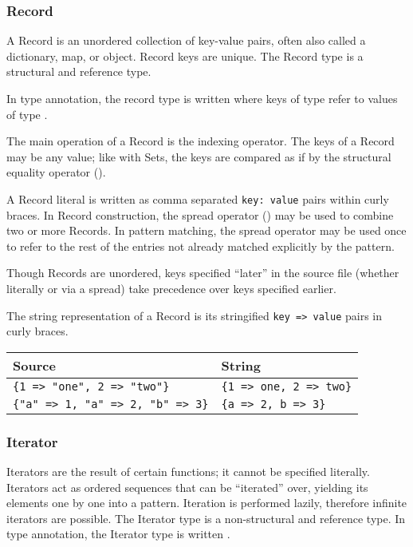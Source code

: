 \subsubsection{Record}

A Record is an unordered collection of key-value pairs, often also called
a dictionary, map, or object. Record keys are unique. The Record type is a
structural and reference type.

In type annotation, the record type is written  where keys of
type  refer to values of type .

The main operation of a Record is the indexing operator. The keys of a
Record may be any value; like with Sets, the keys are compared as if by
the structural equality operator (\op{==}).

A Record literal is written as comma separated \texttt{key: value} pairs
within curly braces. In Record construction, the spread operator ()
may be used to combine two or more Records. In pattern matching, the spread
operator may be used once to refer to the rest of the entries not already
matched explicitly by the pattern.

Though Records are unordered, keys specified ``later'' in the source file
(whether literally or via a spread) take precedence over keys specified
earlier.

The string representation of a Record is its stringified \texttt{key => value}
pairs in curly braces.

\begin{table}[H]
    \centering
    \begin{tabular}{ll}
        \hline
        \textbf{Source} & \textbf{String} \\
        \hline
        \texttt{\{1 => "one", 2 => "two"\}} & \texttt{\{1 => one, 2 => two\}} \\
        \texttt{\{"a" => 1, "a" => 2, "b" => 3\}} & \texttt{\{a => 2, b => 3\}} \\
        \hline
    \end{tabular}
\end{table}

\subsubsection{Iterator}
\label{sec:iterators}

Iterators are the result of certain functions; it cannot be specified literally.
Iterators act as ordered sequences that can be ``iterated'' over, yielding its
elements one by one into a pattern. Iteration is performed lazily, therefore
infinite iterators are possible. The Iterator type is a non-structural and
reference type. In type annotation, the Iterator type is written .

